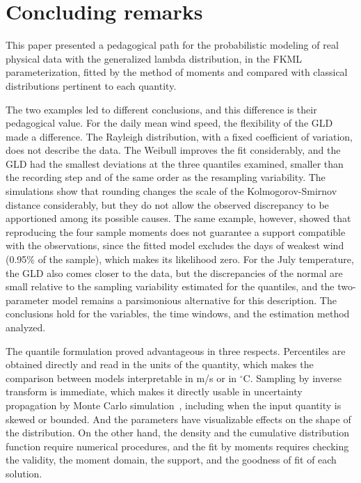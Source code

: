 \section{Concluding remarks}\label{sec:consideracoes}

This paper presented a pedagogical path for the probabilistic modeling of real physical data with the generalized lambda distribution, in the FKML parameterization, fitted by the method of moments and compared with classical distributions pertinent to each quantity.

The two examples led to different conclusions, and this difference is their pedagogical value. For the daily mean wind speed, the flexibility of the GLD made a difference. The Rayleigh distribution, with a fixed coefficient of variation, does not describe the data. The Weibull improves the fit considerably, and the GLD had the smallest deviations at the three quantiles examined, smaller than the recording step and of the same order as the resampling variability. The simulations show that rounding changes the scale of the Kolmogorov-Smirnov distance considerably, but they do not allow the observed discrepancy to be apportioned among its possible causes. The same example, however, showed that reproducing the four sample moments does not guarantee a support compatible with the observations, since the fitted model excludes the days of weakest wind (0.95\% of the sample), which makes its likelihood zero. For the July temperature, the GLD also comes closer to the data, but the discrepancies of the normal are small relative to the sampling variability estimated for the quantiles, and the two-parameter model remains a parsimonious alternative for this description. The conclusions hold for the variables, the time windows, and the estimation method analyzed.

The quantile formulation proved advantageous in three respects. Percentiles are obtained directly and read in the units of the quantity, which makes the comparison between models interpretable in m/s or in $^\circ$C. Sampling by inverse transform is immediate, which makes it directly usable in uncertainty propagation by Monte Carlo simulation~\cite{gums1}, including when the input quantity is skewed or bounded. And the parameters have visualizable effects on the shape of the distribution. On the other hand, the density and the cumulative distribution function require numerical procedures, and the fit by moments requires checking the validity, the moment domain, the support, and the goodness of fit of each solution.

